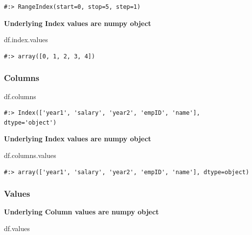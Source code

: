 \documentclass[
]{book}
\newenvironment{Shaded}{\begin{snugshade}}{\end{snugshade}}
\newcommand{\NormalTok}[1]{#1}
\begin{document}
\begin{verbatim}
#:> RangeIndex(start=0, stop=5, step=1)
\end{verbatim}

\textbf{Underlying Index values are numpy object}

\begin{Shaded}
\begin{Highlighting}[]
\NormalTok{df.index.values}
\end{Highlighting}
\end{Shaded}

\begin{verbatim}
#:> array([0, 1, 2, 3, 4])
\end{verbatim}

\hypertarget{columns}{%
\subsubsection{Columns}\label{columns}}

\begin{Shaded}
\begin{Highlighting}[]
\NormalTok{df.columns}
\end{Highlighting}
\end{Shaded}

\begin{verbatim}
#:> Index(['year1', 'salary', 'year2', 'empID', 'name'], dtype='object')
\end{verbatim}

\textbf{Underlying Index values are numpy object}

\begin{Shaded}
\begin{Highlighting}[]
\NormalTok{df.columns.values}
\end{Highlighting}
\end{Shaded}

\begin{verbatim}
#:> array(['year1', 'salary', 'year2', 'empID', 'name'], dtype=object)
\end{verbatim}

\hypertarget{values}{%
\subsubsection{Values}\label{values}}

\textbf{Underlying Column values are numpy object}

\begin{Shaded}
\begin{Highlighting}[]
\NormalTok{df.values}
\end{Highlighting}
\end{Shaded}
\end{document}
